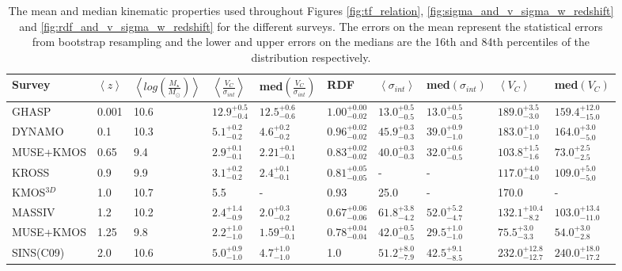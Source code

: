 \documentclass[fleqn,usenatbib]{mn2e}
\begin{document}
\begin{table*}
\centering
\begin{threeparttable}
\caption{The mean and median kinematic properties used throughout Figures \protect\ref{fig:tf_relation}, \protect\ref{fig:sigma_and_v_sigma_w_redshift} and \protect\ref{fig:rdf_and_v_sigma_w_redshift} for the different surveys.
The errors on the mean represent the statistical errors from bootstrap resampling and the lower and upper errors on the medians are the 16th and 84th percentiles of the distribution respectively.}
\label{tab:evolution_numbers}
\begin{tabular}{llllllllll}

 \hline
Survey & $\left< z \right> $ & $\left< log\left(\frac{M_{\star}}{M_{\odot}}\right)\right>$ & $\left< \frac{V_{C}}{\sigma_{int}} \right>$ & med$\left(\frac{V_{C}}{\sigma_{int}}\right)$ & RDF & $ \left< \sigma_{int} \right>$ & med$\left(\sigma_{int}\right)$ & $\left<V_{C}\right>$ & med$\left(V_{C}\right)$  \\[1ex]
 \hline
 GHASP & 0.001 & 10.6 & $12.9^{+0.5}_{-0.4}$ & $12.5^{+0.6}_{-0.6}$ & $1.00^{+0.00}_{-0.02}$ & $13.0^{+0.5}_{-0.5}$ & $13.0^{+0.5}_{-0.5}$ & $189.0^{+3.5}_{-3.0}$ & $159.4^{+12.0}_{-15.0}$ \\[1ex]
 DYNAMO & 0.1 & 10.3 & $5.1^{+0.2}_{-0.2}$ & $4.6^{+0.2}_{-0.2}$ & $0.96^{+0.02}_{-0.02}$ & $45.9^{+0.3}_{-0.3}$ & $39.0^{+0.9}_{-1.0}$ & $183.0^{+1.0}_{-1.0}$ & $164.0^{+3.0}_{-5.0}$ \\[1ex]
 MUSE+KMOS & 0.65 & 9.4 & $2.9^{+0.1}_{-0.1}$ & $2.21^{+0.1}_{-0.1}$ & $0.83^{+0.02}_{-0.02}$ & $40.0^{+0.3}_{-0.3}$ & $32.0^{+0.6}_{-0.5}$ & $103.8^{+1.5}_{-1.6}$ & $73.0^{+2.5}_{-2.5}$ \\[1ex]
 KROSS & 0.9 & 9.9 & $3.1^{+0.2}_{-0.2}$ & $2.4^{+0.1}_{-0.1}$ & $0.81^{+0.05}_{-0.05}$ & - & - & $117.0^{+4.0}_{-4.0}$ & $109.0^{+5.0}_{-5.0}$ \\[1ex]
 KMOS$^{3D}$ & 1.0 & 10.7 & 5.5 & - & 0.93 & 25.0 & - & 170.0 & - \\[1ex]
 MASSIV & 1.2 & 10.2 & $2.4^{+1.4}_{-0.9}$ & $2.0^{+0.3}_{-0.2}$ & $0.67^{+0.06}_{-0.06}$ & $61.8^{+3.8}_{-4.2}$ & $52.0^{+5.2}_{-4.7}$ & $132.1^{+10.4}_{-8.2}$ & $103.0^{+13.4}_{-11.0}$ \\[1ex]
 MUSE+KMOS & 1.25 & 9.8 & $2.2^{+1.0}_{-1.0}$ & $1.59^{+0.1}_{-0.1}$ & $0.78^{+0.04}_{-0.04}$ & $42.0^{+0.5}_{-0.5}$ & $29.5^{+1.0}_{-1.0}$ & $75.5^{+3.0}_{-3.3}$ & $54.0^{+3.0}_{-2.8}$ \\[1ex]
 SINS(C09) & 2.0 & 10.6 & $5.0^{+0.9}_{-1.0}$ & $4.7^{+1.0}_{-1.0}$ & 1.0 & $51.2^{+8.0}_{-7.9}$ & $42.5^{+9.1}_{-8.5}$ & $232.0^{+12.8}_{-12.7}$ & $240.0^{+18.0}_{-17.2}$ \\[1ex]

\end{tabular}
\end{threeparttable}
\end{table*}
\end{document}
